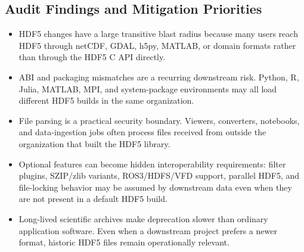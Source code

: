 \documentclass[../main.tex]{subfiles}
\begin{document}
\subsection{Audit Findings and Mitigation Priorities}

\begin{itemize}
    \item HDF5 changes have a large transitive blast radius because many users
    reach HDF5 through netCDF, GDAL, h5py, MATLAB, or domain formats rather than
    through the HDF5 C API directly.
    \item ABI and packaging mismatches are a recurring downstream risk. Python,
    R, Julia, MATLAB, MPI, and system-package environments may all load different
    HDF5 builds in the same organization.
    \item File parsing is a practical security boundary. Viewers, converters,
    notebooks, and data-ingestion jobs often process files received from outside
    the organization that built the HDF5 library.
    \item Optional features can become hidden interoperability requirements:
    filter plugins, SZIP/zlib variants, ROS3/HDFS/VFD support, parallel HDF5,
    and file-locking behavior may be assumed by downstream data even when they
    are not present in a default HDF5 build.
    \item Long-lived scientific archives make deprecation slower than ordinary
    application software. Even when a downstream project prefers a newer format,
    historic HDF5 files remain operationally relevant.
\end{itemize}
\end{document}
